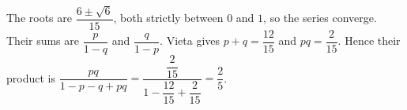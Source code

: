 The roots are $\dfrac{6\pm\sqrt 6}{15}$, both strictly between $0$ and $1$, so the series converge. Their sums are $\dfrac{p}{1-q}$ and $\dfrac{q}{1-p}$. Vieta gives $p+q=\dfrac{12}{15}$ and $pq=\dfrac{2}{15}$. Hence their product is $\dfrac{pq}{1-p-q+pq}=\dfrac{\dfrac{2}{15}}{1-\dfrac{12}{15}+\dfrac{2}{15}}=\boxed{\dfrac{2}{5}}$.
